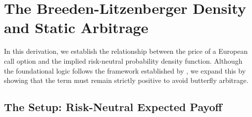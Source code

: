 \documentclass[12pt,oneside]{report}
\theoremstyle{definition}
\theoremstyle{remark}
\begin{document}
\newpage
\section{The Breeden-Litzenberger Density and Static Arbitrage}
\label{sec:breeden_litz_proof}

In this derivation, we establish the relationship between the price of a European call option and the implied risk-neutral probability density function. Although the foundational logic follows the framework established by \citet{breeden1978prices}, we expand this by showing that the term must remain strictly positive to avoid butterfly arbitrage.

\subsection{The Setup: Risk-Neutral Expected Payoff}
\end{document}
